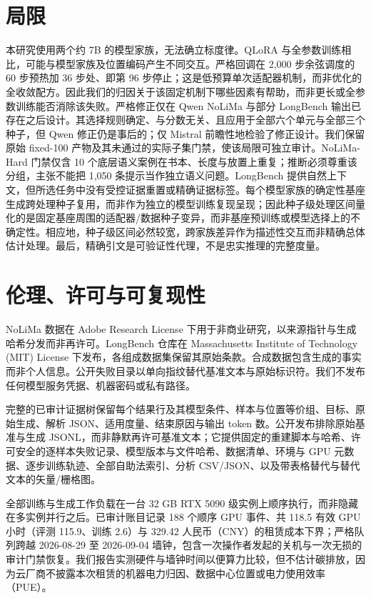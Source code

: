 \documentclass[11pt]{article}
\begin{document}
\section{局限}

本研究使用两个约 7B 的模型家族，无法确立标度律。QLoRA 与全参数训练相比，可能与模型家族及位置编码产生不同交互。严格回调在 2,000 步余弦调度的 60 步预热加 36 步处、即第 96 步停止；这是低预算单次适配器机制，而非优化的全收敛配方。因此我们的归因关于该固定机制下哪些因素有帮助，而非更长或全参数训练能否消除该失败。严格修正仅在 Qwen NoLiMa 与部分 LongBench 输出已存在之后设计。其选择规则确定、与分数无关、且应用于全部六个单元与全部三个种子，但 Qwen 修正仍是事后的；仅 Mistral 前瞻性地检验了修正设计。我们保留原始 fixed-100 产物及其未通过的实际子集门禁，使该局限可独立审计。NoLiMa-Hard 门禁仅含 10 个底层语义案例在书本、长度与放置上重复；推断必须尊重该分组，主张不能把 1,050 条提示当作独立语义问题。LongBench 提供自然上下文，但所选任务中没有受控证据重置或精确证据标签。每个模型家族的确定性基座生成跨处理种子复用，而非作为独立的模型训练复现呈现；因此种子级处理区间量化的是固定基座周围的适配器/数据种子变异，而非基座预训练或模型选择上的不确定性。相应地，种子级区间必然较宽，跨家族差异作为描述性交互而非精确总体估计处理。最后，精确引文是可验证性代理，不是忠实推理的完整度量。

\section{伦理、许可与可复现性}

NoLiMa 数据在 Adobe Research License 下用于非商业研究，以来源指针与生成哈希分发而非再许可。LongBench 仓库在 Massachusetts Institute of Technology (MIT) License 下发布，各组成数据集保留其原始条款。合成数据包含生成的事实而非个人信息。公开失败目录以单向指纹替代基准文本与原始标识符。我们不发布任何模型服务凭据、机器密码或私有路径。

完整的已审计证据树保留每个结果行及其模型条件、样本与位置等价组、目标、原始生成、解析 JSON、适用度量、结束原因与输出 token 数。公开发布排除原始基准与生成 JSONL，而非静默再许可基准文本；它提供固定的重建脚本与哈希、许可安全的逐样本失败记录、模型版本与文件哈希、数据清单、环境与 GPU 元数据、逐步训练轨迹、全部自助法索引、分析 CSV/JSON、以及带表格替代与替代文本的矢量/栅格图。

全部训练与生成工作负载在一台 32 GB RTX 5090 级实例上顺序执行，而非隐藏在多实例并行之后。已审计账目记录 188 个顺序 GPU 事件、共 118.5 有效 GPU 小时（评测 115.9、训练 2.6）与 329.42 人民币（CNY）的租赁成本下界；严格队列跨越 2026-08-29 至 2026-09-04 墙钟，包含一次操作者发起的关机与一次无损的审计门禁恢复。我们报告实测硬件与墙钟时间以便算力比较，但不估计碳排放，因为云厂商不披露本次租赁的机器电力归因、数据中心位置或电力使用效率（PUE）。
\end{document}
